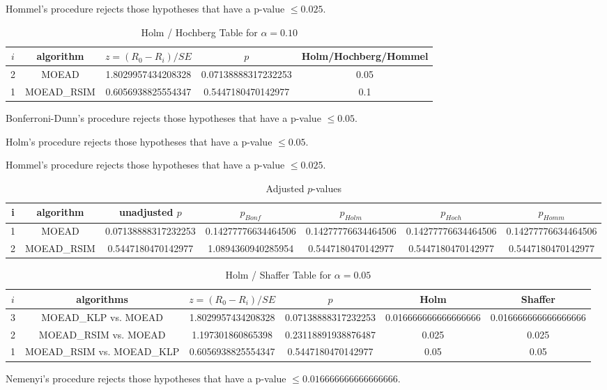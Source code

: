 \documentclass[a4paper,10pt]{article}
\begin{document}
\begin{landscape}
Hommel's procedure rejects those hypotheses that have a p-value $\le0.025$.


\begin{table}[!htp]
\centering\tiny
\caption{Holm / Hochberg Table for $\alpha=0.10$}
\begin{tabular}{ccccc}
$i$&algorithm&$z=(R_0 - R_i)/SE$&$p$&Holm/Hochberg/Hommel\\
\hline
2&MOEAD&1.8029957434208328&0.07138888317232253&0.05\\
1&MOEAD_RSIM&0.6056938825554347&0.5447180470142977&0.1\\
\hline
\end{tabular}
\end{table}
Bonferroni-Dunn's procedure rejects those hypotheses that have a p-value $\le0.05$.


Holm's procedure rejects those hypotheses that have a p-value $\le0.05$.


Hommel's procedure rejects those hypotheses that have a p-value $\le0.025$.


\begin{table}[!htp]
\centering\tiny
\caption{Adjusted $p$-values}
\begin{tabular}{ccccccc}
i&algorithm&unadjusted $p$&$p_{Bonf}$&$p_{Holm}$&$p_{Hoch}$&$p_{Homm}$\\
\hline
1&MOEAD&0.07138888317232253&0.14277776634464506&0.14277776634464506&0.14277776634464506&0.14277776634464506\\
2&MOEAD_RSIM&0.5447180470142977&1.0894360940285954&0.5447180470142977&0.5447180470142977&0.5447180470142977\\
\hline
\end{tabular}
\end{table}

\begin{table}[!htp]
\centering\tiny
\caption{Holm / Shaffer Table for $\alpha=0.05$}
\begin{tabular}{cccccc}
$i$&algorithms&$z=(R_0 - R_i)/SE$&$p$&Holm&Shaffer\\
\hline
3&MOEAD_KLP vs. MOEAD&1.8029957434208328&0.07138888317232253&0.016666666666666666&0.016666666666666666\\
2&MOEAD_RSIM vs. MOEAD&1.197301860865398&0.23118891938876487&0.025&0.025\\
1&MOEAD_RSIM vs. MOEAD_KLP&0.6056938825554347&0.5447180470142977&0.05&0.05\\
\hline
\end{tabular}
\end{table}
Nemenyi's procedure rejects those hypotheses that have a p-value $\le0.016666666666666666$.



\end{landscape}
\end{document}
